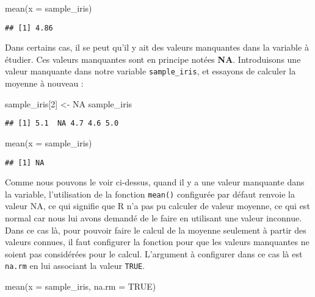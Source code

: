 \documentclass[
]{book}
\newenvironment{Shaded}{\begin{snugshade}}{\end{snugshade}}
\newcommand{\AttributeTok}[1]{\textcolor[rgb]{0.77,0.63,0.00}{#1}}
\newcommand{\ConstantTok}[1]{\textcolor[rgb]{0.00,0.00,0.00}{#1}}
\newcommand{\DecValTok}[1]{\textcolor[rgb]{0.00,0.00,0.81}{#1}}
\newcommand{\FunctionTok}[1]{\textcolor[rgb]{0.00,0.00,0.00}{#1}}
\newcommand{\NormalTok}[1]{#1}
\newcommand{\OtherTok}[1]{\textcolor[rgb]{0.56,0.35,0.01}{#1}}
\begin{document}
\begin{Shaded}
\begin{Highlighting}[]
\FunctionTok{mean}\NormalTok{(}\AttributeTok{x =}\NormalTok{ sample\_iris)}
\end{Highlighting}
\end{Shaded}

\begin{verbatim}
## [1] 4.86
\end{verbatim}

Dans certains cas, il se peut qu'il y ait des valeurs manquantes dans la variable à étudier. Ces valeurs manquantes sont en principe notées \textbf{NA}. Introduisons une valeur manquante dans notre variable \texttt{sample\_iris}, et essayons de calculer la moyenne à nouveau :

\begin{Shaded}
\begin{Highlighting}[]
\NormalTok{sample\_iris[}\DecValTok{2}\NormalTok{] }\OtherTok{\textless{}{-}} \ConstantTok{NA}
\NormalTok{sample\_iris}
\end{Highlighting}
\end{Shaded}

\begin{verbatim}
## [1] 5.1  NA 4.7 4.6 5.0
\end{verbatim}

\begin{Shaded}
\begin{Highlighting}[]
\FunctionTok{mean}\NormalTok{(}\AttributeTok{x =}\NormalTok{ sample\_iris)}
\end{Highlighting}
\end{Shaded}

\begin{verbatim}
## [1] NA
\end{verbatim}

Comme nous pouvons le voir ci-dessus, quand il y a une valeur manquante dans la variable, l'utilisation de la fonction \texttt{mean()} configurée par défaut renvoie la valeur NA, ce qui signifie que R n'a pas pu calculer de valeur moyenne, ce qui est normal car nous lui avons demandé de le faire en utilisant une valeur inconnue. Dans ce cas là, pour pouvoir faire le calcul de la moyenne seulement à partir des valeurs connues, il faut configurer la fonction pour que les valeurs manquantes ne soient pas considérées pour le calcul. L'argument à configurer dans ce cas là est \texttt{na.rm} en lui associant la valeur \texttt{TRUE}.

\begin{Shaded}
\begin{Highlighting}[]
\FunctionTok{mean}\NormalTok{(}\AttributeTok{x =}\NormalTok{ sample\_iris, }\AttributeTok{na.rm =} \ConstantTok{TRUE}\NormalTok{)}
\end{Highlighting}
\end{Shaded}
\end{document}
